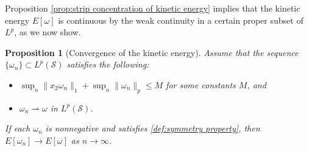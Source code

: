 \documentclass[11pt,letterpaper]{amsart}
\newtheorem{prop}[thm]{Proposition}
\theoremstyle{definition}
\theoremstyle{remark}
\renewcommand{\S}{\mathcal{S}}
\numberwithin{equation}{section}
\begin{document}
Proposition \ref{prop:strip concentration of kinetic energy} implies that the kinetic energy $E[\omega]$ is continuous by the weak continuity in a certain proper subset of $L^p$, as we now show.

\begin{prop}[Convergence of the kinetic energy]
\label{prop:strip energy convergence}
Assume that the sequence \(\{\omega_n\} \subset L^p(\S)\) satisfies the following:
\begin{itemize}
    \item \(\sup_n \|x_2\omega_n\|_1 + \sup_n \|\omega_n\|_p \leq M\) for some constants \(M\), and
    \item \(\omega_n \rightharpoonup \omega\) in \(L^p(\S)\).
\end{itemize}
If each $\omega_n$ is nonnegative and satisfies \eqref{def:symmetry property}, then
\(E[\omega_n] \to E[\omega] \) as \(n \rightarrow \infty\).
\end{prop}
\end{document}

